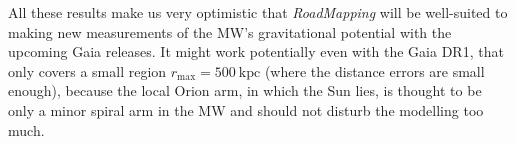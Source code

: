 \documentclass[iop,revtex4,numberedappendix,appendixfloats]{emulateapj}
\newcommand{\RM}{{\sl RoadMapping}}
\begin{document}
All these results make us very optimistic that \RM{} will be well-suited to making new measurements of the MW's gravitational potential with the upcoming Gaia releases. It might work potentially even with the Gaia DR1, that only covers a small region $r_\text{max}=500~\text{kpc}$ (where the distance errors are small enough), because the local Orion arm, in which the Sun lies, is thought to be only a minor spiral arm in the MW and should not disturb the modelling too much. 



{}

\end{document}
